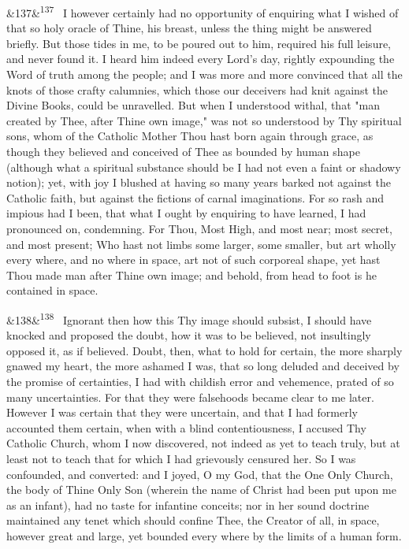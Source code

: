 \documentclass[12pt]{article}
\newcommand{\para}[1][]{\par\noindent\ifx&#1&\else\textsuperscript{\footnotesize #1}~\fi}
\begin{document}
\para[137] I however certainly had no opportunity of enquiring what I wished of that so holy oracle of Thine, his breast, unless the thing might be answered briefly. But those tides in me, to be poured out to him, required his full leisure, and never found it. I heard him indeed every Lord's day, rightly expounding the Word of truth among the people; and I was more and more convinced that all the knots of those crafty calumnies, which those our deceivers had knit against the Divine Books, could be unravelled. But when I understood withal, that "man created by Thee, after Thine own image," was not so understood by Thy spiritual sons, whom of the Catholic Mother Thou hast born again through grace, as though they believed and conceived of Thee as bounded by human shape (although what a spiritual substance should be I had not even a faint or shadowy notion); yet, with joy I blushed at having so many years barked not against the Catholic faith, but against the fictions of carnal imaginations. For so rash and impious had I been, that what I ought by enquiring to have learned, I had pronounced on, condemning. For Thou, Most High, and most near; most secret, and most present; Who hast not limbs some larger, some smaller, but art wholly every where, and no where in space, art not of such corporeal shape, yet hast Thou made man after Thine own image; and behold, from head to foot is he contained in space.

\para[138] Ignorant then how this Thy image should subsist, I should have knocked and proposed the doubt, how it was to be believed, not insultingly opposed it, as if believed. Doubt, then, what to hold for certain, the more sharply gnawed my heart, the more ashamed I was, that so long deluded and deceived by the promise of certainties, I had with childish error and vehemence, prated of so many uncertainties. For that they were falsehoods became clear to me later. However I was certain that they were uncertain, and that I had formerly accounted them certain, when with a blind contentiousness, I accused Thy Catholic Church, whom I now discovered, not indeed as yet to teach truly, but at least not to teach that for which I had grievously censured her. So I was confounded, and converted: and I joyed, O my God, that the One Only Church, the body of Thine Only Son (wherein the name of Christ had been put upon me as an infant), had no taste for infantine conceits; nor in her sound doctrine maintained any tenet which should confine Thee, the Creator of all, in space, however great and large, yet bounded every where by the limits of a human form.
\end{document}
